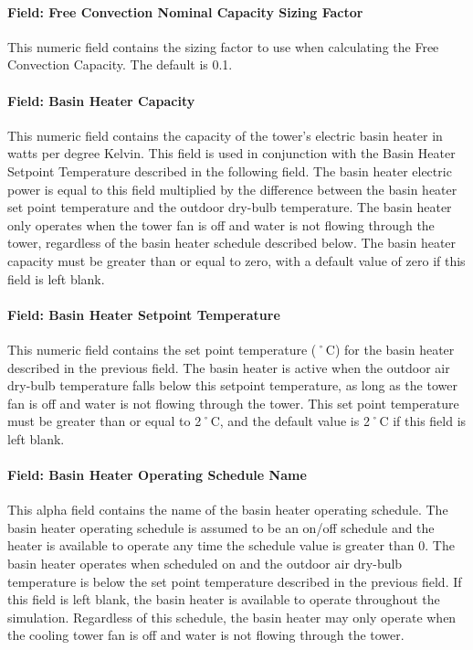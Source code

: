 \paragraph{Field: Free Convection Nominal Capacity Sizing Factor}\label{field-free-convection-nominal-capacity-sizing-factor}

This numeric field contains the sizing factor to use when calculating the Free Convection Capacity. The default is 0.1.

\paragraph{Field: Basin Heater Capacity}\label{field-basin-heater-capacity}

This numeric field contains the capacity of the tower's electric basin heater in watts per degree Kelvin. This field is used in conjunction with the Basin Heater Setpoint Temperature described in the following field. The basin heater electric power is equal to this field multiplied by the difference between the basin heater set point temperature and the outdoor dry-bulb temperature. The basin heater only operates when the tower fan is off and water is not flowing through the tower, regardless of the basin heater schedule described below. The basin heater capacity must be greater than or equal to zero, with a default value of zero if this field is left blank.

\paragraph{Field: Basin Heater Setpoint Temperature}\label{field-basin-heater-setpoint-temperature}

This numeric field contains the set point temperature (˚C) for the basin heater described in the previous field. The basin heater is active when the outdoor air dry-bulb temperature falls below this setpoint temperature, as long as the tower fan is off and water is not flowing through the tower. This set point temperature must be greater than or equal to 2˚C, and the default value is 2˚C if this field is left blank.

\paragraph{Field: Basin Heater Operating Schedule Name}\label{field-basin-heater-operating-schedule-name}

This alpha field contains the name of the basin heater operating schedule. The basin heater operating schedule is assumed to be an on/off schedule and the heater is available to operate any time the schedule value is greater than 0. The basin heater operates when scheduled on and the outdoor air dry-bulb temperature is below the set point temperature described in the previous field. If this field is left blank, the basin heater is available to operate throughout the simulation. Regardless of this schedule, the basin heater may only operate when the cooling tower fan is off and water is not flowing through the tower.

